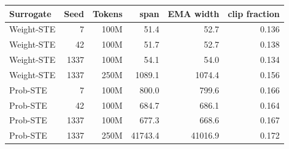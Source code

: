 \begin{tabular}{@{}lrrrrr@{}}
\toprule
Surrogate & Seed & Tokens & span & EMA width & clip fraction \\
\midrule
Weight-STE & 7 & 100M & 51.4 & 52.7 & 0.136 \\
Weight-STE & 42 & 100M & 51.7 & 52.7 & 0.138 \\
Weight-STE & 1337 & 100M & 54.1 & 54.0 & 0.134 \\
Weight-STE & 1337 & 250M & 1089.1 & 1074.4 & 0.156 \\
Prob-STE & 7 & 100M & 800.0 & 799.6 & 0.166 \\
Prob-STE & 42 & 100M & 684.7 & 686.1 & 0.164 \\
Prob-STE & 1337 & 100M & 677.3 & 668.6 & 0.167 \\
Prob-STE & 1337 & 250M & 41743.4 & 41016.9 & 0.172 \\
\bottomrule
\end{tabular}
